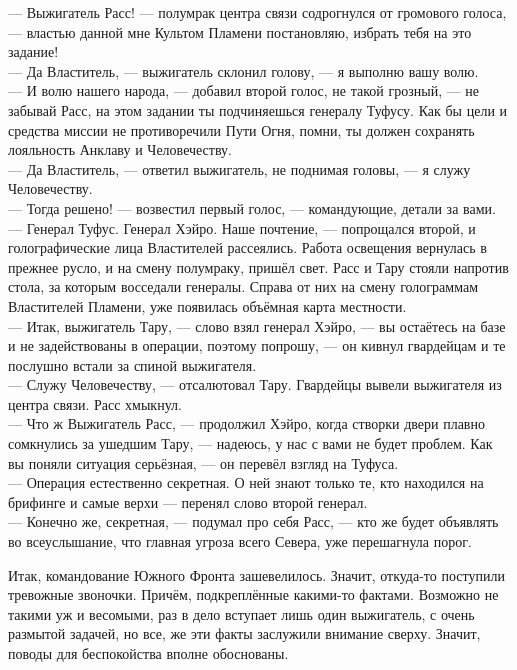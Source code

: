\noindent --- Выжигатель Расс! --- полумрак центра связи содрогнулся от 
громового голоса, --- властью данной мне Культом Пламени постановляю, избрать 
тебя на это задание!\\
--- Да Властитель, --- выжигатель склонил голову, --- я выполню вашу волю.\\
--- И волю нашего народа, --- добавил второй голос, не такой грозный, --- не 
забывай Расс, на этом задании ты подчиняешься генералу Туфусу. Как бы цели и 
средства миссии не противоречили Пути Огня, помни, ты должен сохранять 
лояльность Анклаву и Человечеству.\\
--- Да Властитель, --- ответил выжигатель, не поднимая головы, --- я служу 
Человечеству.\\
--- Тогда решено! --- возвестил первый голос, --- командующие, детали за вами.\\
--- Генерал Туфус. Генерал Хэйро. Наше почтение, --- попрощался второй, и 
голографические лица Властителей рассеялись. Работа освещения вернулась в 
прежнее русло, и на смену полумраку, пришёл свет. Расс и Тару стояли напротив 
стола, за которым восседали генералы. Справа от них на смену голограммам 
Властителей Пламени, уже появилась объёмная карта местности.\\
--- Итак, выжигатель Тару, --- слово взял генерал Хэйро, --- вы остаётесь на 
базе и не задействованы в операции, поэтому попрошу, --- он кивнул гвардейцам и 
те послушно встали за спиной выжигателя.\\
--- Служу Человечеству, --- отсалютовал Тару. Гвардейцы вывели выжигателя из 
центра связи. Расс хмыкнул.\\
--- Что ж Выжигатель Расс, --- продолжил Хэйро, когда створки двери плавно 
сомкнулись за ушедшим Тару, --- надеюсь, у нас с вами не будет проблем. Как вы 
поняли ситуация серьёзная, --- он перевёл взгляд на Туфуса.\\
--- Операция естественно секретная. О ней знают только те, кто находился на 
брифинге и самые верхи --- перенял слово второй генерал.\\
--- Конечно же, секретная, --- подумал про себя Расс, --- кто же будет 
объявлять во всеуслышание, что главная угроза всего Севера, уже перешагнула 
порог.

Итак, командование Южного Фронта зашевелилось. Значит, откуда-то поступили тревожные звоночки. Причём, подкреплённые какими-то фактами. Возможно не такими уж и весомыми, раз в дело вступает лишь один выжигатель, с очень размытой задачей, но все, же эти факты заслужили внимание сверху. Значит, поводы для беспокойства вполне обоснованы.

